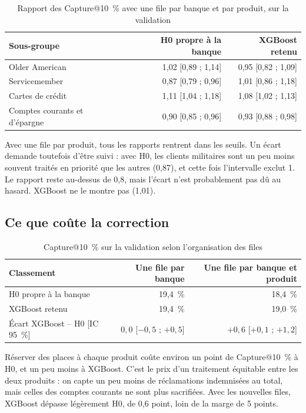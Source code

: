 \documentclass[11pt,a4paper]{article}
\begin{document}
\begin{table}[H]
\centering\small
\begin{tabular}{@{}l r r@{}}
\toprule
Sous-groupe & H0 propre à la banque & XGBoost retenu \\
\midrule
Older American & 1,02 [0,89 ; 1,14] & 0,95 [0,82 ; 1,09] \\
Servicemember & 0,87 [0,79 ; 0,96] & 1,01 [0,86 ; 1,18] \\
Cartes de crédit & 1,11 [1,04 ; 1,18] & 1,08 [1,02 ; 1,13] \\
Comptes courants et d'épargne & 0,90 [0,85 ; 0,96] & 0,93 [0,88 ; 0,98] \\
\bottomrule
\end{tabular}
\caption{Rapport des Capture@10~\% avec une file par banque et par produit, sur la validation}
\end{table}

Avec une file par produit, tous les rapports rentrent dans les seuils. Un écart demande toutefois d'être suivi : avec H0, les clients militaires sont un peu moins souvent traités en priorité que les autres (0,87), et cette fois l'intervalle exclut 1. Le rapport reste au-dessus de 0,8, mais l'écart n'est probablement pas dû au hasard. XGBoost ne le montre pas (1,01).

\subsection{Ce que coûte la correction}

\begin{table}[H]
\centering\small
\begin{tabular}{@{}l r r@{}}
\toprule
Classement & Une file par banque & Une file par banque et produit \\
\midrule
H0 propre à la banque & 19,4~\% & 18,4~\% \\
XGBoost retenu & 19,4~\% & 19,0~\% \\
Écart XGBoost -- H0 [IC 95~\%] & $0{,}0$ [$-0{,}5$ ; $+0{,}5$] & $+0{,}6$ [$+0{,}1$ ; $+1{,}2$] \\
\bottomrule
\end{tabular}
\caption{Capture@10~\% sur la validation selon l'organisation des files}
\end{table}

Réserver des places à chaque produit coûte environ un point de Capture@10~\% à H0, et un peu moins à XGBoost. C'est le prix d'un traitement équitable entre les deux produits : on capte un peu moins de réclamations indemnisées au total, mais celles des comptes courants ne sont plus sacrifiées. Avec les nouvelles files, XGBoost dépasse légèrement H0, de 0,6 point, loin de la marge de 5 points.
\end{document}
